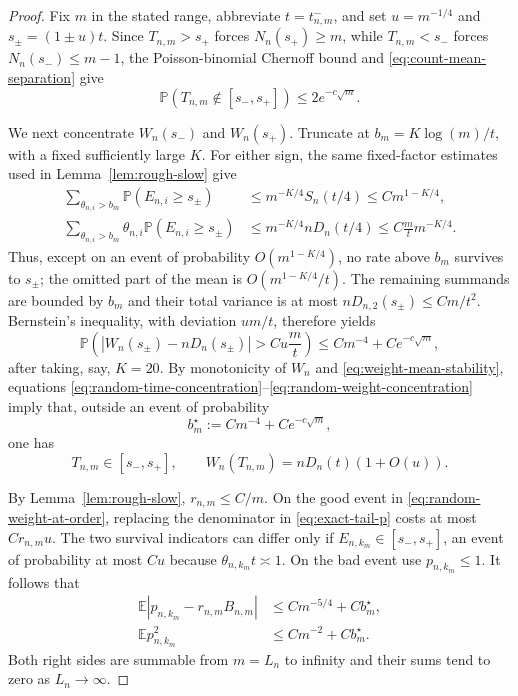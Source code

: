 \documentclass[11pt]{article}
\theoremstyle{remark}
\theoremstyle{plain}
\newcommand{\E}{\mathbb E}
\newcommand{\Pp}{\mathbb P}
\begin{document}
\begin{proof}
Fix $m$ in the stated range, abbreviate $t=t_{n,m}^-$, and set
$u=m^{-1/4}$ and $s_\pm=(1\pm u)t$.  Since $T_{n,m}>s_+$ forces
$N_n(s_+)\ge m$, while $T_{n,m}<s_-$ forces $N_n(s_-)\le m-1$,
the Poisson-binomial Chernoff bound and
\eqref{eq:count-mean-separation} give
\begin{equation}\label{eq:random-time-concentration}
 \Pp(T_{n,m}\notin[s_-,s_+])\le2e^{-c\sqrt m}.
\end{equation}

We next concentrate $W_n(s_-)$ and $W_n(s_+)$.  Truncate at
$b_m=K\log(m)/t$, with a fixed sufficiently large $K$.  For either sign, the
same fixed-factor estimates used in Lemma~\ref{lem:rough-slow} give
\begin{align*}
 \sum_{\theta_{n,i}>b_m}\Pp(E_{n,i}\ge s_\pm)
 &\le m^{-K/4}S_n(t/4)\le C m^{1-K/4},\\
 \sum_{\theta_{n,i}>b_m}\theta_{n,i}
       \Pp(E_{n,i}\ge s_\pm)
 &\le m^{-K/4}nD_n(t/4)\le C\frac mtm^{-K/4}.
\end{align*}
Thus, except on an event of probability $O(m^{1-K/4})$, no rate above $b_m$
survives to $s_\pm$; the omitted part of the mean is
$O(m^{1-K/4}/t)$.  The remaining summands are bounded by $b_m$ and their
total variance is at most $nD_{n,2}(s_\pm)\le Cm/t^2$.  Bernstein's
inequality, with deviation $u m/t$, therefore yields
\begin{equation}\label{eq:random-weight-concentration}
 \Pp\left(\left|W_n(s_\pm)-nD_n(s_\pm)\right|>C u\frac mt\right)
 \le C m^{-4}+Ce^{-c\sqrt m},
\end{equation}
after taking, say, $K=20$.  By monotonicity of $W_n$ and
\eqref{eq:weight-mean-stability}, equations
\eqref{eq:random-time-concentration}--\eqref{eq:random-weight-concentration}
imply that, outside an event of probability
\begin{equation}\label{eq:slow-bad-probability}
 b_m^\star:=Cm^{-4}+Ce^{-c\sqrt m},
\end{equation}
one has
\begin{equation}\label{eq:random-weight-at-order}
 T_{n,m}\in[s_-,s_+],\qquad
 W_n(T_{n,m})=nD_n(t)(1+O(u)).
\end{equation}

By Lemma~\ref{lem:rough-slow}, $r_{n,m}\le C/m$.  On the good event in
\eqref{eq:random-weight-at-order}, replacing the denominator in
\eqref{eq:exact-tail-p} costs at most $Cr_{n,m}u$.  The two survival
indicators can differ only if $E_{n,k_m}\in[s_-,s_+]$, an event of probability
at most $Cu$ because $\theta_{n,k_m}t\asymp1$.  On the bad event use
$p_{n,k_m}\le1$.  It follows that
\begin{align}
 \E|p_{n,k_m}-r_{n,m}B_{n,m}|
 &\le Cm^{-5/4}+Cb_m^\star,\label{eq:one-p-error}\\
 \E p_{n,k_m}^2
 &\le Cm^{-2}+Cb_m^\star.\label{eq:one-p-square}
\end{align}
Both right sides are summable from $m=L_n$ to infinity and their sums tend to
zero as $L_n\to\infty$.
\end{proof}
\end{document}
